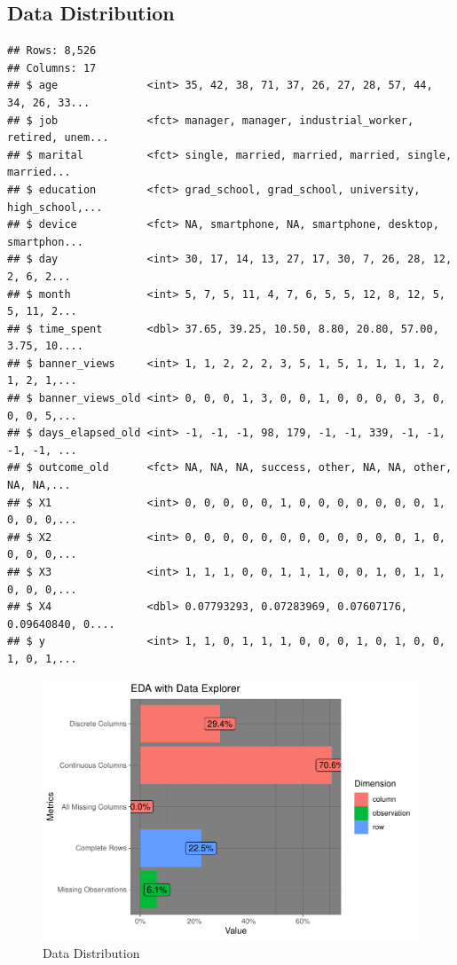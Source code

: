 \documentclass[
]{article}
\begin{document}
\subsection{Data Distribution}

\begin{verbatim}
## Rows: 8,526
## Columns: 17
## $ age              <int> 35, 42, 38, 71, 37, 26, 27, 28, 57, 44, 34, 26, 33...
## $ job              <fct> manager, manager, industrial_worker, retired, unem...
## $ marital          <fct> single, married, married, married, single, married...
## $ education        <fct> grad_school, grad_school, university, high_school,...
## $ device           <fct> NA, smartphone, NA, smartphone, desktop, smartphon...
## $ day              <int> 30, 17, 14, 13, 27, 17, 30, 7, 26, 28, 12, 2, 6, 2...
## $ month            <int> 5, 7, 5, 11, 4, 7, 6, 5, 5, 12, 8, 12, 5, 5, 11, 2...
## $ time_spent       <dbl> 37.65, 39.25, 10.50, 8.80, 20.80, 57.00, 3.75, 10....
## $ banner_views     <int> 1, 1, 2, 2, 2, 3, 5, 1, 5, 1, 1, 1, 1, 2, 1, 2, 1,...
## $ banner_views_old <int> 0, 0, 0, 1, 3, 0, 0, 1, 0, 0, 0, 0, 3, 0, 0, 0, 5,...
## $ days_elapsed_old <int> -1, -1, -1, 98, 179, -1, -1, 339, -1, -1, -1, -1, ...
## $ outcome_old      <fct> NA, NA, NA, success, other, NA, NA, other, NA, NA,...
## $ X1               <int> 0, 0, 0, 0, 0, 1, 0, 0, 0, 0, 0, 0, 0, 1, 0, 0, 0,...
## $ X2               <int> 0, 0, 0, 0, 0, 0, 0, 0, 0, 0, 0, 0, 1, 0, 0, 0, 0,...
## $ X3               <int> 1, 1, 1, 0, 0, 1, 1, 1, 0, 0, 1, 0, 1, 1, 0, 0, 0,...
## $ X4               <dbl> 0.07793293, 0.07283969, 0.07607176, 0.09640840, 0....
## $ y                <int> 1, 1, 0, 1, 1, 1, 0, 0, 0, 1, 0, 1, 0, 0, 1, 0, 1,...
\end{verbatim}

\begin{figure}

{\centering \includegraphics[width=0.75\linewidth]{report_files/figure-latex/Data Distribution-1} 

}

\caption{Data Distribution}\label{fig:Data Distribution}
\end{figure}
\end{document}
